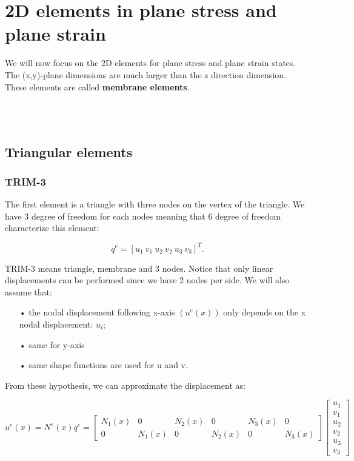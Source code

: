 
\chapter{2D elements in plane stress and plane strain}
	We will now focus on the 2D elements for plane stress and plane strain states. The (x,y)-plane dimensions are much larger than the z direction dimension. These elements are called \textbf{membrane elements}.
	
	\ \\\\
	
\section{Triangular elements}
\subsection{TRIM-3}
	The first element is a triangle with three nodes on the vertex of the triangle. We have 3 degree of freedom for each nodes meaning that 6 degree of freedom characterize this element: 
	
	\begin{equation}
	q^e = [u_1 \  v_1 \ u_2 \  v_2 \ u_3 \  v_3]^T.
	\end{equation}
	
	TRIM-3 means triangle, membrane and 3 nodes. Notice that only linear displacements can be performed since we have 2 nodes per side. We will also assume that: 
	
	\begin{itemize}
	\item[•] the nodal displacement following x-axis $(u^e(x))$ only depends on the x nodal displacement: $u_i$;
	
	\item[•] same for y-axis
	
	\item[•] same shape functions are used for u and v. 
	\end{itemize}
	
	From these hypothesis, we can approximate the displacement as:
	
	\begin{equation}
	u^e(x) = N^e(x) q^e = \left[
	\begin{array}{cccccc}
	N_1(x) & 0 & N_2(x) & 0 & N_3(x) & 0\\
	0 & N_1(x) & 0 & N_2(x) & 0 & N_3(x)
	\end{array}
	\right]
	\left[
	\begin{array}{c}
	u_1\\
	v_1\\
	u_2\\
	v_2\\
	u_3\\
	v_3
	\end{array}
	\right]
	\end{equation}
	

